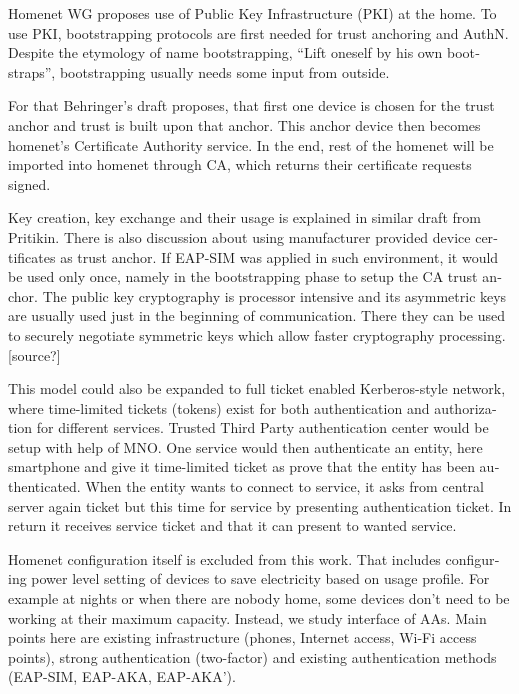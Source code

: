 \documentclass[12pt,a4paper,english]{tutthesis}
\begin{document}
\begin{otherlanguage}{english}
Homenet WG proposes use of Public Key Infrastructure (PKI) at the home. To use PKI, bootstrapping
protocols are first needed for trust anchoring and AuthN.  
Despite the etymology  of name bootstrapping, ``Lift oneself by his own bootstraps'', 
bootstrapping usually needs some input from outside. 

For that Behringer's draft\cite{draft-behringer-bootstrap} proposes,
that first one device is chosen for the trust anchor and trust is
built upon that anchor. This anchor device then becomes homenet's
Certificate Authority service. In the end, rest of the homenet will be
imported into homenet through CA, which returns their certificate
requests signed.


Key creation, key exchange and their usage is explained in similar
draft from Pritikin\cite{draft-pritikin-bootstrap}. There is also discussion about using
manufacturer provided device certificates as trust anchor.  If EAP-SIM
was applied in such environment, it would be used only once, namely in
the bootstrapping phase to setup the CA trust anchor.  The public key
cryptography is processor intensive and its asymmetric keys are
usually used just in the beginning of communication. There they can be
used to securely negotiate symmetric keys which allow faster
cryptography processing. [source?]


This model could also be expanded to full ticket enabled
Kerberos-style network, where time-limited tickets (tokens) exist for
both authentication and authorization for different services. Trusted
Third Party authentication center would be setup with help of MNO.
One service would then authenticate an entity, here smartphone and
give it time-limited ticket as prove that the entity has been authenticated.
When the entity wants to connect to service, it asks from central 
server again ticket but this time for service by presenting
authentication ticket. In return it receives service ticket and that
it can present to wanted service.






Homenet configuration itself is excluded from this work.
That includes configuring power level setting of devices to save electricity
based on usage profile. For example at nights or when there are nobody
home, some devices don't need to be working at their maximum
capacity. Instead, we study interface of AAs.  Main points here
are existing infrastructure (phones, Internet access, Wi-Fi
access points), strong authentication (two-factor) and existing
authentication methods (EAP-SIM, EAP-AKA, EAP-AKA').

\end{otherlanguage}
\end{document}
